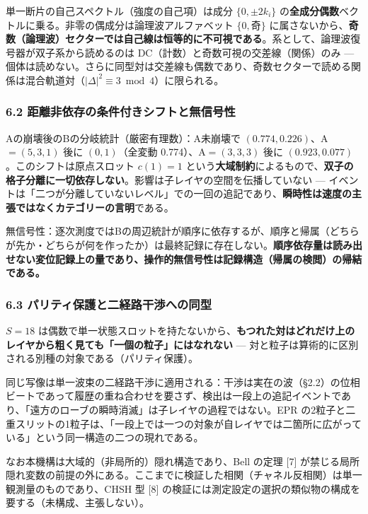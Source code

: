 \documentclass[
]{ltjsarticle}
\begin{document}
単一断片の自己スペクトル（強度の自己項）は成分 \(\{0,\pm2k_i\}\)
の\textbf{全成分偶数}ベクトルに乗る。非零の偶成分は論理波アルファベット
\(\{0,奇\}\)
に属さないから、\textbf{奇数（論理波）セクターでは自己線は恒等的に不可視である}。系として、論理波復号器が双子系から読めるのは
DC（計数）と奇数可視の交差線（関係）のみ ---
個体は読めない。さらに同型対は交差線も偶数であり、奇数セクターで読める関係は混合軌道対（\(|\Delta|^2\equiv3\bmod4\)）に限られる。

\subsubsection{6.2
距離非依存の条件付きシフトと無信号性}\label{ux8dddux96e2ux975eux4f9dux5b58ux306eux6761ux4ef6ux4ed8ux304dux30b7ux30d5ux30c8ux3068ux7121ux4fe1ux53f7ux6027}

Aの崩壊後のBの分岐統計（厳密有理数）：A未崩壊で
\((0.774,0.226)\)、A\(=(5,3,1)\) 後に \((0,1)\)（全変動
0.774）、A\(=(3,3,3)\) 後に \((0.923,0.077)\)。このシフトは原点スロット
\(c(1)=1\)
という\textbf{大域制約}によるもので、\textbf{双子の格子分離に一切依存しない}。影響は子レイヤの空間を伝播していない
---
イベントは「二つが分離していないレベル」での一回の追記であり、\textbf{瞬時性は速度の主張ではなくカテゴリーの言明}である。

無信号性：逐次測度ではBの周辺統計が順序に依存するが、順序と帰属（どちらが先か・どちらが何を作ったか）は最終記録に存在しない。\textbf{順序依存量は読み出せない変位記録上の量であり、操作的無信号性は記録構造（帰属の検閲）の帰結である。}

\subsubsection{6.3
パリティ保護と二経路干渉への同型}\label{ux30d1ux30eaux30c6ux30a3ux4fddux8b77ux3068ux4e8cux7d4cux8defux5e72ux6e09ux3078ux306eux540cux578b}

\(S=18\)
は偶数で単一状態スロットを持たないから、\textbf{もつれた対はどれだけ上のレイヤから粗く見ても「一個の粒子」にはなれない}
--- 対と粒子は算術的に区別される別種の対象である（パリティ保護）。

同じ写像は単一波束の二経路干渉に適用される：干渉は実在の波（§2.2）の位相ビートであって履歴の重ね合わせを要さず、検出は一段上の追記イベントであり、「遠方のローブの瞬時消滅」は子レイヤの過程ではない。EPR
の2粒子と二重スリットの1粒子は、「一段上では一つの対象が自レイヤでは二箇所に広がっている」という同一構造の二つの現れである。

なお本機構は大域的（非局所的）隠れ構造であり、Bell の定理 {[}7{]}
が禁じる局所隠れ変数の前提の外にある。ここまでに検証した相関（チャネル反相関）は単一観測量のものであり、CHSH
型 {[}8{]}
の検証には測定設定の選択の類似物の構成を要する（未構成、主張しない）。
\end{document}
